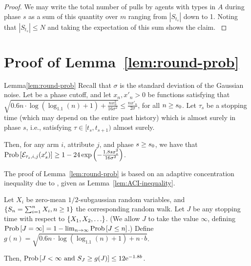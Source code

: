 \begin{proof}
{We may write the total number of pulls by agents with types in $A$ during phase $s$ as a sum of this quantity over $m$ ranging from $|S_{t_s}|$ down to 1.  Noting that $|S_{t_s}| \le N$ and taking the expectation of this sum shows the claim. 
}
\end{proof}







\section{Proof of Lemma~\ref{lem:round-prob}}
\label{sec:lemma5-proof}

\begin{rlemma}{Lemma}{\ref{lem:round-prob}}
Recall that $\sigma$ is the standard deviation of the Gaussian noise.
Let \LatePhase be a phase cutoff, 
and let $x_n, x'_n > 0$ be functions satisfying that
$\sqrt{0.6 n \cdot \log (\log_{1.1}(n) + 1) + \frac{n x_n^2}{16 \sigma^2}}
\leq \frac{n x'_n}{2 \sigma}$,
for all $n \geq s_0$.
Let $\tau_s$ be a stopping time
(which may depend on the entire past history)
which is almost surely in phase $s$,
i.e., satisfying $\tau \in [t_s, t_{s+1})$ almost surely.

Then, for any arm $i$, attribute $j$, and phase $s \geq s_0$,
we have that
$\Prob{\AccE{\tau_s}{i}{j}{x'_s}}
\geq 1 - 24 \exp\left(-\frac{1.8 s x_s^2}{16 \sigma^2} \right)$.
\end{rlemma}

The proof of Lemma~\ref{lem:round-prob} is based on an adaptive
concentration inequality due to \cite{zhao2016adaptive},
given as Lemma~\ref{lem:ACI-inequality}.

\begin{lemma}
\label{lem:ACI-inequality}
Let $X_i$ be zero-mean $1/2$-subgaussian random variables,
and $\{ S_n = \sum_{i=1}^n X_i, n \geq 1 \}$ the corresponding random walk.
Let $J$ be any stopping time with respect to $\{ X_1, X_2, \ldots \}$.
(We allow $J$ to take the value $\infty$,
defining $\Prob{J = \infty} = 1 - \lim_{n \to \infty} \Prob{J \leq n}$.)
Define 
$g(n)  = \sqrt{0.6 n \cdot \log (\log_{1.1}(n) + 1) + n \cdot b}$.

Then, 
$\Prob{J < \infty \mbox{ and } S_J \geq g(J)} \leq 12 \e^{-1.8 b}$.
\end{lemma}

